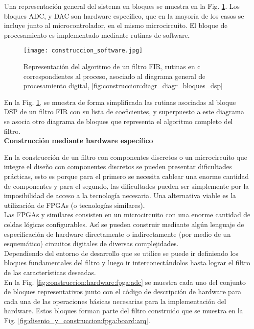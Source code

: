 \documentclass[informe.tex]{subfiles}
\begin{document}
Una representación general del sistema en bloques se muestra en la Fig. \ref{fig:construccion:software}. Los bloques ADC, y DAC son hardware especifico, que en la mayoría de los casos se incluye junto al microcontrolador, en el mismo microcircuito. El bloque de procesamiento es implementado mediante rutinas de software.\newline  

	\begin{figure}[h]
		\centering
		\texttt{[image: construccion\_software.jpg]}
		\caption{Representación del algoritmo de un filtro FIR, rutinas en c correspondientes al proceso, asociado al diagrama general de procesamiento digital, \ref{fig:construccion:diagr_diagr_bloques_dsp} }
		\label{fig:construccion:software}
	\end{figure}

En la Fig. \ref{fig:construccion:software}, se muestra de forma simplificada las rutinas asociadas al bloque DSP de un filtro FIR con su lista de coeficientes, y superpuesto a este diagrama se asocia otro diagrama de bloques que representa el algoritmo completo del filtro.\\


\textbf{Construcción mediante hardware específico}\newline

En la construcción de un filtro con componentes discretos o un microcircuito que integre el diseño con componentes discretos se pueden presentar dificultades prácticas, esto es porque para el primero se necesita cablear una enorme cantidad de componentes y para el segundo, las dificultades  pueden ser simplemente por la imposibilidad de acceso a la tecnología necesaria. Una alternativa viable es la utilización de FPGAs (o tecnologías similares).\\

Las FPGAs y similares consisten en un microcircuito con una enorme cantidad de celdas lógicas configurables. Así se pueden construir mediante algún lenguaje de especificación de hardware directamente o indirectamente (por medio de un esquemático) circuitos digitales de diversas complejidades.\\

Dependiendo del entorno de desarrollo que se utilice se puede ir definiendo los bloques fundamentales del filtro y luego ir interconectándolos hasta lograr el filtro de las características deseadas.\\

En la Fig. \ref{fig:construccion:hardware:fpga:adc} se muestra cada uno del conjunto de bloques representativos junto con el código de descripción de hardware para cada una de las operaciones básicas necesarias para la implementación del hardware. Estos bloques forman parte del filtro construido que se muestra en la Fig. \ref{fig:disenio_y_construccion:fpga:board:arq}.\\
\end{document}
